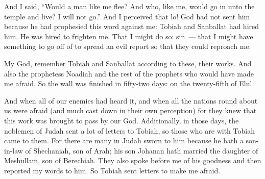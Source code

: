 \begin{inparaenum}
   And I said, ``Would a man like me flee? And who, like me, would go in unto the temple and live? I will not go.''%
   And I perceived that lo! God had not sent him because he had prophesied this word against me: Tobiah and Sanballat had hired him.%
   He was hired to frighten me. That I might do so: sin~--- that I might have something to go off of to spread an evil report so that they could reproach me.%

   My God, remember Tobiah and Sanballat according to these, their works. And also the prophetess Noadiah and the rest of the prophets who would have made me afraid.%
   So the wall was finished in fifty-two days: on the twenty-fifth of Elul.%

   And when all of our enemies had heard it, and when all the nations round about us were afraid (and much cast down in their own perception) for they knew that this work was brought to pass by our God.%
   Additionally, in those days, the noblemen of Judah sent a lot of letters to Tobiah, so those who are with Tobiah came to them.%
   For there are many in Judah sworn to him because he hath a son-in-law of Shechaniah, son of Arah; his son Johanan hath married the daughter of Meshullam, son of Berechiah.%
   They also spoke before me of his goodness and then reported my words to him. So Tobiah sent letters to make me afraid.%
\end{inparaenum}

